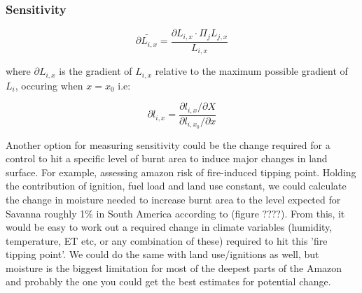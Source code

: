 \subsubsection{Sensitivity}
\begin{shaded}
\begin{equation}
    \bar{\partial L_{i, x}} = \frac{\partial L_{i, x} \cdot \Pi_{j} L_{j, x}}{L_{i, x}}
\end{equation}

where $\partial L_{i, x}$ is the gradient of $L_{i, x}$ relative to the maximum possible gradient of $L_{i}$, occuring when $x = x_{0}$ i.e:

\begin{equation}
    \partial l_{i, x} = \frac{\partial l_{i, x} / \partial X}
                             {\partial l_{i, x_{0}} / \partial x}
\end{equation}

Another option for measuring sensitivity could be the change required for a control to hit a specific level of burnt area to induce major changes in land surface.
For example, assessing amazon risk of fire-induced tipping point. Holding the contribution of ignition, fuel load and land use constant, we could calculate the change in moisture needed to increase burnt area to the level expected for Savanna roughly 1\% in South America according to \cite{lehmann2011deciphering} (figure ????).
From this, it would be easy to work out a required change in climate variables (humidity, temperature, ET etc, or any combination of these) required to hit this 'fire tipping point'.
We could do the same with land use/ignitions as well, but moisture is the biggest limitation for most of the deepest parts of the Amazon and probably the one you could get the best estimates for potential change.

\end{shaded}
